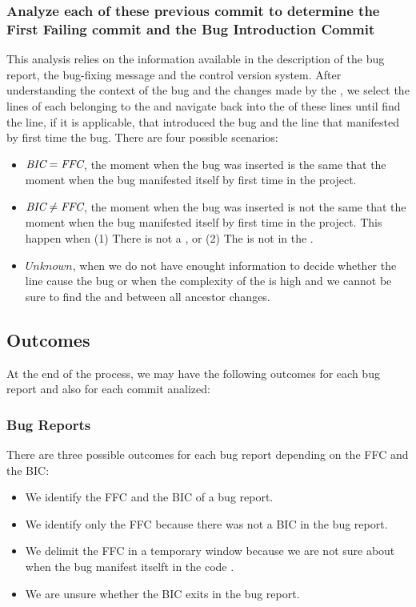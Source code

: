 \documentclass[a4paper, 12pt]{book}
\begin{document}
\subsubsection{Analyze each of these previous commit to determine the First Failing commit and the Bug Introduction Commit}

This analysis relies on the information available in the description of the bug report, the bug-fixing message and the control version system. After understanding the context of the bug and the changes made by the \BFC, we select the lines of each \pc belonging to the  and navigate back into the \ACS of these lines until find the line, if it is applicable, that introduced the bug and the line that manifested by first time the bug. There are four possible scenarios:

\begin{itemize}
	\item $ \emph{BIC} = \emph{FFC} $, the moment when the bug was inserted is the same that the moment when the bug manifested itself by first time in the project.
	\item $ \emph{BIC} \not= \emph{FFC} $, the moment when the bug was inserted is not the same that the moment when the bug manifested itself by first time in the project. This happen when (1) There is not a \BIC, or (2) The \BIC is not in the .
	\item $ Unknown $, when we do not have enought information to decide whether the line cause the bug or when the complexity of the \BFC is high and we cannot be sure to find the \FFC and \BIC between all ancestor changes.
\end{itemize}


\subsection{Outcomes}
At the end of the process, we may have the following outcomes for each bug report and also for each commit analized:

\subsubsection{Bug Reports}
There are three possible outcomes for each bug report depending on the FFC and the BIC:

\begin{itemize}
	\item We identify the FFC and the BIC of a bug report.
	\item We identify only the FFC because there was not a BIC in the bug report.
	\item We delimit the FFC in a temporary window because we are not sure about when the bug manifest itselft in the code .
	\item We are unsure whether the BIC exits in the bug report.
\end{itemize}
\end{document}
